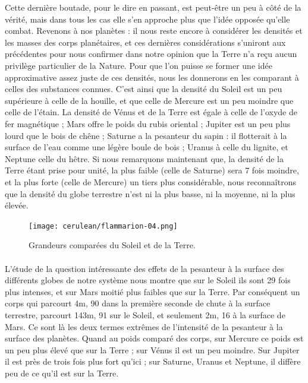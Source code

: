 \documentclass[a4paper, 11pt, oneside, landscape]{article}
\begin{document}
Cette dernière boutade, pour le dire en passant, est peut-être un peu à côté de la vérité, mais dans tous les cas elle s'en approche plus que l'idée opposée qu'elle combat. Revenons à nos planètes : il nous reste encore à considérer les densités et les masses des corps planétaires, et ces dernières considérations s'uniront aux précédentes pour nous confirmer dans notre opinion que la Terre n'a reçu aucun privilège particulier de la Nature. Pour que l'on puisse se former une idée approximative assez juste de ces densités, nous les donnerons en les comparant à celles des substances connues. C'est ainsi que la densité du Soleil est un peu supérieure à celle de la houille, et que celle de Mercure est un peu moindre que celle de l'étain. La densité de Vénus et de la Terre est égale à celle de l'oxyde de fer magnétique ; Mars offre le poids du rubis oriental ; Jupiter est un peu plus lourd que le bois de chêne ; Saturne a la pesanteur du sapin : il flotterait à la surface de l'eau comme une légère boule de bois ; Uranus à celle du lignite, et Neptune celle du hêtre. Si nous remarquons maintenant que, la densité de la Terre étant prise pour unité, la plus faible (celle de Saturne) sera 7 fois moindre, et la plus forte (celle de Mercure) un tiers plus considérable, nous reconnaîtrons que la densité du globe terrestre n'est ni la plus basse, ni la moyenne, ni la plus élevée.
\clearpage
\begin{landscape}
\vspace*{\fill}
\begin{figure}[H]
\centering
\texttt{[image: cerulean/flammarion-04.png]}
\caption{Grandeurs comparées du Soleil et de la Terre.}
\end{figure}
\vspace*{\fill}
\end{landscape}
\clearpage
\paragraph{}
L'étude de la question intéressante des effets de la pesanteur à la surface des différents globes de notre système nous montre que sur le Soleil ils sont 29 fois plus intenses, et sur Mars moitié plus faibles que sur la Terre. Par conséquent un corps qui parcourt 4m, 90 dans la première seconde de chute à la surface terrestre, parcourt 143m, 91 sur le Soleil, et seulement 2m, 16 à la surface de Mars. Ce sont là les deux termes extrêmes de l'intensité de la pesanteur à la surface des planètes. Quand au poids comparé des corps, sur Mercure ce poids est un peu plus élevé que sur la Terre ; sur Vénus il est un peu moindre. Sur Jupiter il est près de trois fois plus fort qu'ici ; sur Saturne, Uranus et Neptune, il diffère peu de ce qu'il est sur la Terre.
\end{document}
